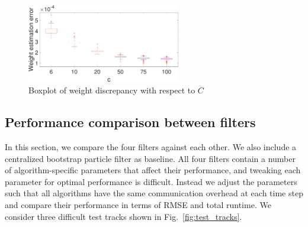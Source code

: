 \documentclass[10pt,letterpaper,final]{article}
\begin{document}
\begin{figure}
\centering
\includegraphics[width=0.6\textwidth]{Figures/boxplot_Clusterpf_weight_discrepancy}
\caption{Boxplot of weight discrepancy with respect to $C$}
\label{fig:boxplot_Clusterpf_weight_discrepancy}
\end{figure}

\subsection{Performance comparison between filters}
In this section, we compare the four filters against each other. We also include a centralized bootstrap particle filter as baseline. All four filters contain a number of algorithm-specific parameters that affect their performance, and tweaking each parameter for optimal performance is difficult. Instead we adjust the parameters such that all algorithms have the same communication overhead at each time step and compare their performance in terms of RMSE and total runtime. We consider three difficult test tracks shown in Fig.~\ref{fig:test_tracks}. 
\end{document}
